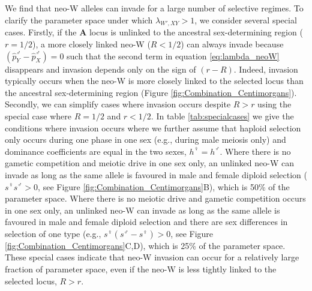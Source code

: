 \documentclass[12pt]{article}
\begin{document}
We find that neo-W alleles can invade for a large number of selective regimes. 
To clarify the parameter space under which $\lambda_{W',XY}>1$, we consider several special cases. 
Firstly, if the \textbf{A} locus is unlinked to the ancestral sex-determining region ($r=1/2$), a more closely linked neo-W ($R<1/2$) can always invade because $\left( \hat{p}^\male_Y-\hat{p}^\male_X \right)=0$ such that the second term in equation \eqref{eq:lambda_neoW} disappears and invasion depends only on the sign of $(r-R)$. 
Indeed, invasion typically occurs when the neo-W is more closely linked to the selected locus than the ancestral sex-determining region (Figure \ref{fig:Combination_Centimorgans}).
Secondly, we can simplify cases where invasion occurs despite $R>r$ using the special case where $R=1/2$ and $r<1/2$. 
In table \ref{tab:specialcases} we give the conditions where invasion occurs where we further assume that haploid selection only occurs during one phase in one sex (e.g., during male meiosis only) and dominance coefficients are equal in the two sexes, $h^\female=h^\male$. 
Where there is no gametic competition and meiotic drive in one sex only, an unlinked neo-W can invade as long as the same allele is favoured in male and female diploid selection ($s^\female s^\male>0$, see Figure \ref{fig:Combination_Centimorgans}B), which is 50\% of the parameter space. 
Where there is no meiotic drive and gametic competition occurs in one sex only, an unlinked neo-W can invade as long as the same allele is favoured in male and female diploid selection and there are sex differences in selection of one type (e.g., $s^\female(s^\male-s^\female)>0$, see Figure \ref{fig:Combination_Centimorgans}C,D), which is 25\% of the parameter space. 
These special cases indicate that neo-W invasion can occur for a relatively large fraction of parameter space, even if the neo-W is less tightly linked to the selected locus, $R>r$. 
\end{document}
